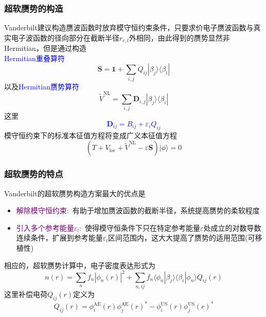 \documentclass[cjk,slidestop,compress,mathserif,blue]{beamer}
\begin{document}
\frame
{
\frametitle{超软赝势的构造}
\textrm{Vanderbilt}建议构造赝波函数时放弃模守恒约束条件，只要求价电子赝波函数与真实电子波函数的径向部分在截断半径$r_{c,l}$外相同，由此得到的赝势显然非\textrm{Hermitian}，但是通过构造\\\textcolor{blue}{\textrm{Hermitian}重叠算符}
\begin{displaymath}
	\mathbf{S}=\mathbf{1}+\sum_{i,j}Q_{ij}|\beta_j\rangle\langle\beta_i|
\end{displaymath}
以及\textcolor{blue}{\textrm{Hermitian}赝势算符}
\begin{displaymath}
	\tilde V^{\mathrm{NL}}=\sum_{i,j}\mathbf{D}_{i,j}|\beta_j\rangle\langle\beta_i|
\end{displaymath}
这里\textcolor{blue}{
\begin{displaymath}
	\mathbf{D}_{ij}=B_{ij}+\varepsilon_iQ_{ij}
\end{displaymath}}
模守恒约束下的标准本征值方程将变成广义本征值方程
\begin{displaymath}
	(T+V_{\mathrm{loc}}+\tilde V^{\mathrm{NL}}-\varepsilon\mathbf{S})|\phi\rangle=0
\end{displaymath}
}

\frame
{
\frametitle{超软赝势的特点}
\textrm{Vanderbilt}的超软赝势构造方案最大的优点是
\begin{itemize}
	\item \textcolor{purple}{解除模守恒约束}:~有助于增加赝波函数的截断半径，系统提高赝势的柔软程度
	\item \textcolor{purple}{引入多个参考能量$\varepsilon_l$}:~使得模守恒条件下只在特定参考能量$\varepsilon$处成立的对数导数连续条件，扩展到参考能量$\varepsilon_l$区间范围内，这大大提高了赝势的适用范围(可移植性)
\end{itemize}

相应的，超软赝势计算中，电子密度表达形式为
\begin{displaymath}
	n(r)=\sum_nf_n|\phi_n(r)|^2+\sum_{n,ij}f_n\langle\phi_n|\beta_j\rangle\langle\beta_i|\phi_n\rangle Q_{ij}(r)
\end{displaymath}
这里补偿电荷$Q_{ij}(r)$定义为
\begin{displaymath}
	Q_{ij}(r)=\phi_i^{\mathrm{AE}}(r)\phi_j^{\mathrm{AE}}(r)^{\ast}-\phi_i^{\mathrm{US}}(r)\phi_j^{\mathrm{US}}(r)^{\ast}
\end{displaymath}
}
\end{document}
